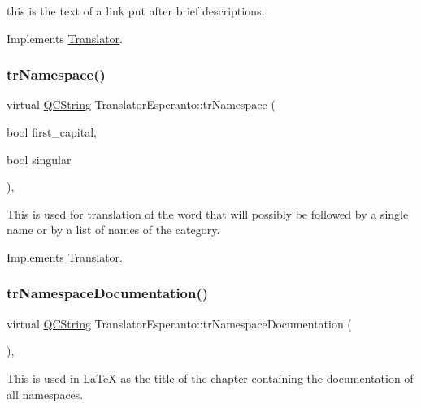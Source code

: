 this is the text of a link put after brief descriptions. 

Implements \mbox{\hyperlink{class_translator}{Translator}}.

\mbox{\label{class_translator_esperanto_aa71e252bf8eb50244529418f7e709f66}} 
\subsubsection{\texorpdfstring{trNamespace()}{trNamespace()}}
{\footnotesize\ttfamily virtual \mbox{\hyperlink{class_q_c_string}{Q\+C\+String}} Translator\+Esperanto\+::tr\+Namespace (\begin{DoxyParamCaption}\item[{bool}]{first\+\_\+capital,  }\item[{bool}]{singular }\end{DoxyParamCaption})\hspace{0.3cm}{\ttfamily [inline]}, {\ttfamily [virtual]}}

This is used for translation of the word that will possibly be followed by a single name or by a list of names of the category. 

Implements \mbox{\hyperlink{class_translator}{Translator}}.

\mbox{\label{class_translator_esperanto_a3fe31ab35327545772e6983fd328bfe8}} 
\subsubsection{\texorpdfstring{trNamespaceDocumentation()}{trNamespaceDocumentation()}}
{\footnotesize\ttfamily virtual \mbox{\hyperlink{class_q_c_string}{Q\+C\+String}} Translator\+Esperanto\+::tr\+Namespace\+Documentation (\begin{DoxyParamCaption}{ }\end{DoxyParamCaption})\hspace{0.3cm}{\ttfamily [inline]}, {\ttfamily [virtual]}}

This is used in La\+TeX as the title of the chapter containing the documentation of all namespaces. 

